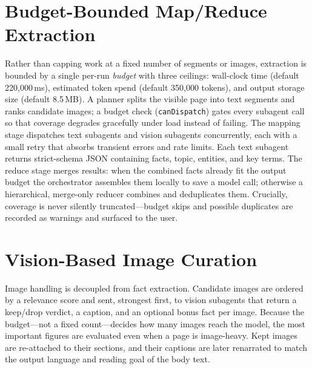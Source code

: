 \documentclass[a4paper,12pt]{report}
\begin{document}
\section{Budget-Bounded Map/Reduce Extraction}
Rather than capping work at a fixed number of segments or images, extraction is
bounded by a single per-run \emph{budget} with three ceilings: wall-clock time
(default 220{,}000\,ms), estimated token spend (default 350{,}000 tokens), and
output storage size (default 8.5\,MB). A planner splits the visible page into
text segments and ranks candidate images; a budget check (\texttt{canDispatch})
gates every subagent call so that coverage degrades gracefully under load instead
of failing. The mapping stage dispatches text subagents and vision subagents
concurrently, each with a small retry that absorbs transient errors and rate
limits. Each text subagent returns strict-schema JSON containing facts, topic,
entities, and key terms. The reduce stage merges results: when the combined facts
already fit the output budget the orchestrator assembles them locally to save a
model call; otherwise a hierarchical, merge-only reducer combines and deduplicates
them. Crucially, coverage is never silently truncated---budget skips and possible
duplicates are recorded as warnings and surfaced to the user.

\section{Vision-Based Image Curation}
Image handling is decoupled from fact extraction. Candidate images are ordered by
a relevance score and sent, strongest first, to vision subagents that return a
keep/drop verdict, a caption, and an optional bonus fact per image. Because the
budget---not a fixed count---decides how many images reach the model, the most
important figures are evaluated even when a page is image-heavy. Kept images are
re-attached to their sections, and their captions are later renarrated to match
the output language and reading goal of the body text.
\end{document}
